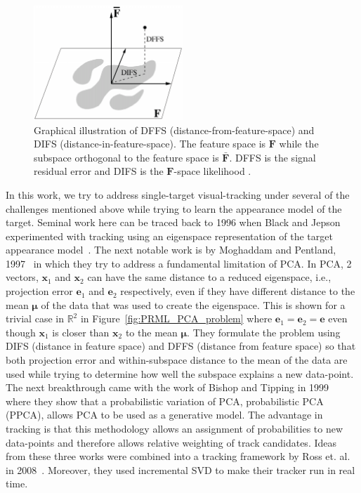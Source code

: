 \begin{Body}
								\begin{figure}[t]
								\centering
								\includegraphics[width=0.5\textwidth]{thesis/1998_JNL_ProbVisLearning_Moghaddam_fig3.png}
								\caption{Graphical illustration of DFFS (distance-from-feature-space) and DIFS (distance-in-feature-space).  The feature space is $\mathbf{F}$ while the subspace orthogonal to the feature space is $\bar{\mathbf{F}}$.  DFFS is the signal residual error and DIFS is the $\mathbf{F}$-space likelihood \cite{1997_JNL_EigenTRK_Moghaddam}.}
					\label{fig:1997_JNL_DIFSDFFS_Moghaddam}
								\end{figure}

In this work, we try to address single-target visual-tracking under several of the challenges mentioned above while trying to learn the appearance model of the target.  Seminal work here can be traced back to 1996 when Black and Jepson experimented with tracking using an eigenspace representation of the target appearance model~\cite{1998_JNL_Eigentracking_Black}.  The next notable work is by Moghaddam and Pentland, 1997~\cite{1997_JNL_EigenTRK_Moghaddam} in which they try to address a fundamental limitation of PCA.  In PCA, 2 vectors, $\mathbf{x}_1$ and $\mathbf{x}_2$ can have the same distance to a reduced eigenspace, i.e., projection error $\mathbf{e}_1$ and $\mathbf{e}_2$ respectively, even if they have different distance to the mean $\boldsymbol\mu$ of the data that was used to create the eigenspace.  This is shown for a trivial case in $\mathbb{R}^2$ in Figure~\ref{fig:PRML_PCA_problem} where $\mathbf{e}_1=\mathbf{e}_2=\mathbf{e}$ even though $\mathbf{x}_1$ is closer than $\mathbf{x}_2$ to the mean $\boldsymbol\mu$.  They formulate the problem using DIFS (distance in feature space) and DFFS (distance from feature space) so that both projection error and within-subspace distance to the mean of the data are used while trying to determine how well the subspace explains a new data-point.  The next breakthrough came with the work of Bishop and Tipping in 1999~\cite{1999_JNL_PPCA_Tipping} where they show that a probabilistic variation of PCA, probabilistic PCA (PPCA), allows PCA to be used as a generative model.  The advantage in tracking is that this methodology allows an assignment of probabilities to new data-points and therefore allows relative weighting of track candidates.  Ideas from these three works were combined into a tracking framework by Ross et. al. in 2008~\cite{2008_JNL_subspaceTRK_Ross}.  Moreover, they used incremental SVD to make their tracker run in real time.  


\end{Body}
